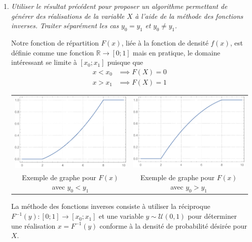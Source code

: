 \documentclass[a4paper,11pt]{report}
\begin{document}
\begin{enumerate}[\indent a)]
{\em Le développement du point d) n'est pas demandé. }

\item {\em Utiliser le résultat précédent pour proposer un algorithme permettant de générer des réalisations de la variable $X$ à l'aide de la méthode des fonctions inverses. Traiter séparément les cas $y_{0} = y_{1}$ et $y_{0} \neq y_{1}$.}

Notre fonction de répartition $F(x)$, liée à la fonction de densité $f(x)$, est définie comme une fonction $\mathbb{R} \rightarrow [0;1]$ mais en pratique, le domaine intéressant se limite à $[x_0;x_1]$ puisque que
\begin{align*}
	x < x_0 &\implies F(X) = 0 \\
	x > x_1 &\implies F(X) = 1
\end{align*}

\begin{center}
	\begin{tabular}{cc}
		\includegraphics[width=7cm]{img_graph2} & \includegraphics[width=7cm]{img_graph1} \\
		{\footnotesize Exemple de graphe pour $F(x)$ avec $y_0 < y_1$} & {\footnotesize Exemple de graphe pour $F(x)$ avec $y_0 > y_1$}
	\end{tabular}
\end{center}

La méthode des fonctions inverses consiste à utiliser la réciproque  $F^{-1}(y) : [0;1] \rightarrow [x_0;x_1]$ et une variable $y \sim \mathcal{U}(0, 1)$ pour déterminer une réalisation $x = F^{-1}(y)$ conforme à la densité de probabilité désirée pour $X$.


\end{enumerate}
\end{document}
